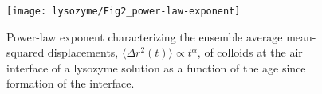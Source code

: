 \begin{figure}
 \texttt{[image: lysozyme/Fig2\_power-law-exponent]}
 \caption{\label{fig:power-law_expon} Power-law exponent characterizing the ensemble average mean-squared displacements, $\langle \Delta r^2(t) \rangle \propto t^{\alpha}$, of colloids at the air interface of a lysozyme solution as a function of the age since formation of the interface.}
\end{figure}



